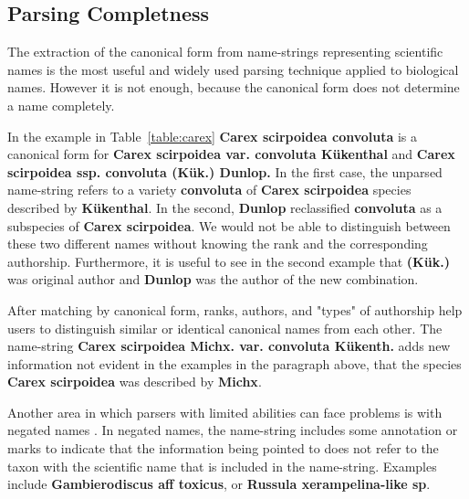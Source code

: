 \documentclass{bmcart}
\begin{document}
\subsection*{Parsing Completness}

The extraction of the canonical form from name-strings representing scientific
names is the most useful and widely used parsing technique applied to biological names. However it
is not enough, because the canonical form does not determine a name completely.

In the example in Table~\ref{table:carex} \textbf{Carex scirpoidea convoluta}
is a canonical form for \textbf{Carex scirpoidea var. convoluta Kükenthal} and
\textbf{Carex scirpoidea ssp. convoluta (Kük.) Dunlop.} In the first case, the
unparsed name-string refers to a variety \textbf{convoluta} of \textbf{Carex
scirpoidea} species described by \textbf{Kükenthal}. In the second,
\textbf{Dunlop} reclassified \textbf{convoluta} as a subspecies of \textbf{Carex
scirpoidea}. We would not be able to distinguish between these two different
names without knowing the rank and the corresponding authorship.
Furthermore, it is useful to see in the second example that \textbf{(Kük.)}
was original author and \textbf{Dunlop} was the author of the new combination.


After matching by canonical form, ranks, authors, and "types" of authorship
help users to distinguish similar or identical canonical names from each other.
The name-string \textbf{Carex scirpoidea Michx. var. convoluta Kükenth.} adds
new information not evident in the examples in the paragraph above, that the
species \textbf{Carex scirpoidea} was described by \textbf{Michx}.

Another area in which parsers with limited abilities can face  problems is with
negated names \cite{Patterson:inpress-a}. In negated names, the name-string
includes some annotation or marks to indicate that the information being
pointed to does not refer to the taxon with the scientific name that is
included in the name-string. Examples include \textbf{Gambierodiscus aff
toxicus}, or \textbf{Russula xerampelina-like sp}.

\end{document}
